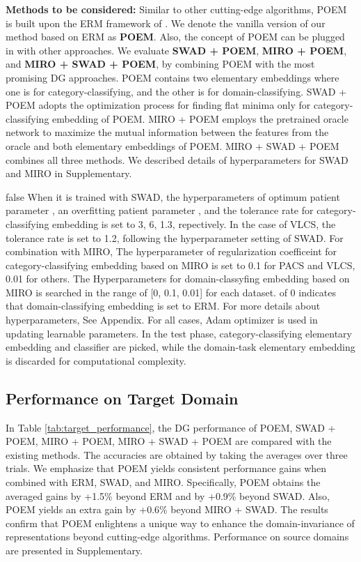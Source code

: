 \documentclass[letterpaper]{article} \usepackage{aaai23}  \usepackage{times}  \usepackage{helvet}  \usepackage{courier}  \usepackage[hyphens]{url}  \usepackage{graphicx} \urlstyle{rm} \def\UrlFont{\rm}  \usepackage{natbib}  \usepackage{caption} \frenchspacing  \setlength{\pdfpagewidth}{8.5in}  \setlength{\pdfpageheight}{11in}  \usepackage[labelsep=period]{caption}
\begin{document}
\textbf{Methods to be considered:} Similar to other cutting-edge algorithms, POEM is built upon the ERM framework of \cite{ERM}. We denote the vanilla version of our method based on ERM as \textbf{POEM}. 
Also, the concept of POEM can be plugged in with other approaches.
We evaluate \textbf{SWAD + POEM}, \textbf{MIRO + POEM}, and \textbf{MIRO + SWAD + POEM}, by combining POEM with the most promising DG approaches.
POEM contains two elementary embeddings where one is for category-classifying, and the other is for domain-classifying.
SWAD + POEM adopts the optimization process for finding flat minima only for category-classifying embedding of POEM.
MIRO + POEM employs the pretrained oracle network to maximize the mutual information between the features from the oracle and both elementary embeddings of POEM. MIRO + SWAD + POEM combines all three methods. We described details of hyperparameters for SWAD and MIRO in Supplementary.



\if false
When it is trained with SWAD, the hyperparameters of optimum patient parameter , an overfitting patient parameter , and the tolerance rate  for category-classifying embedding is set to 3, 6, 1.3, repectively. In the case of VLCS, the tolerance rate  is set to 1.2, following the hyperparameter setting of SWAD\cite{SWAD}. For combination with MIRO, The hyperparameter of regularization coefficeint  for category-classifying embedding based on MIRO\cite{MIRO} is set to 0.1 for PACS and VLCS, 0.01 for others. The Hyperparameters for domain-classyfing embedding based on MIRO is searched in the range of [0, 0.1, 0.01] for each dataset.  of 0 indicates that domain-classifying embedding is set to ERM. For more details about hyperparameters, See Appendix.
For all cases, Adam optimizer is used in updating learnable parameters. In the test phase, category-classifying elementary embedding and classifier are picked, while the domain-task elementary embedding is discarded for computational complexity.
\fi



\subsection{Performance on Target Domain}
In Table \ref{tab:target_performance}, the DG performance of POEM, SWAD + POEM, MIRO + POEM, MIRO + SWAD + POEM are compared with the existing methods.
The accuracies are obtained by taking the averages over three trials.
We emphasize that POEM yields consistent performance gains when combined with ERM, SWAD, and MIRO.
Specifically, POEM obtains the averaged gains by +1.5\% beyond ERM and by +0.9\% beyond SWAD. 
Also, POEM yields an extra gain by +0.6\% beyond MIRO + SWAD.
The results confirm that POEM enlightens a unique way to enhance the domain-invariance of representations beyond cutting-edge algorithms. Performance on source domains are presented in Supplementary.
\end{document}
